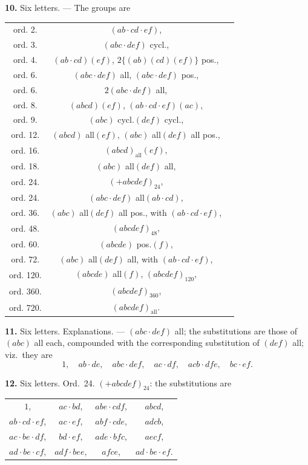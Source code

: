 \documentclass[11pt,a4paper]{article}
\begin{document}
\vspace{0.5em}
\textbf{10.} Six letters. --- The groups are
\begin{center}
\begin{tabular}{ccl}
ord.  2. & $(ab \cdot cd \cdot ef)$, \\
ord.  3. & $(abc \cdot def)$ cycl., \\
ord.  4. & $(ab \cdot cd)(ef)$, \quad $2\{(ab)(cd)(ef)\}$ pos., \\
ord.  6. & $(abc \cdot def)$ all, \quad $(abc \cdot def)$ pos., \\
ord.  6. & $2(abc \cdot def)$ all, \\
ord.  8. & $(abcd)(ef)$, \quad $(ab \cdot cd \cdot ef)(ac)$, \\
ord.  9. & $(abc)$ cycl.$(def)$ cycl., \\
ord. 12. & $(abcd)$ all$(ef)$, \quad $(abc)$ all$(def)$ all pos., \\
ord. 16. & $(abcd)_{\text{all}}(ef)$, \\
ord. 18. & $(abc)$ all$(def)$ all, \\
ord. 24. & $(+abcdef)_{24}$, \\
ord. 24. & $(abc \cdot def)$ all$(ab \cdot cd)$, \\
ord. 36. & $(abc)$ all$(def)$ all pos., with $(ab \cdot cd \cdot ef)$, \\
ord. 48. & $(abcdef)_{48}$, \\
ord. 60. & $(abcde)$ pos.$(f)$, \\
ord. 72. & $(abc)$ all$(def)$ all, with $(ab \cdot cd \cdot ef)$, \\
ord. 120. & $(abcde)$ all$(f)$, \quad $(abcdef)_{120}$, \\
ord. 360. & $(abcdef)_{360}$, \\
ord. 720. & $(abcdef)_{\text{all}}$.
\end{tabular}
\end{center}

\vspace{0.5em}
\textbf{11.} Six letters. Explanations. --- $(abc \cdot def)$ all; the substitutions are those of $(abc)$ all each, compounded with the corresponding substitution of $(def)$ all; viz.\ they are
\[
1, \quad ab \cdot de, \quad abc \cdot def, \quad ac \cdot df, \quad acb \cdot dfe, \quad bc \cdot ef.
\]

\vspace{0.5em}
\textbf{12.} Six letters. Ord.~24. $(+abcdef)_{24}$: the substitutions are
\begin{center}
\begin{tabular}{cccc}
$1$, & $ac \cdot bd$, & $abe \cdot cdf$, & $abcd$, \\
$ab \cdot cd \cdot ef$, & $ac \cdot ef$, & $abf \cdot cde$, & $adcb$, \\
$ac \cdot be \cdot df$, & $bd \cdot ef$, & $ade \cdot bfc$, & $aecf$, \\
$ad \cdot be \cdot cf$, & $adf \cdot bee$, & $afce$, & $ad \cdot be \cdot ef$.
\end{tabular}
\end{center}
\end{document}
